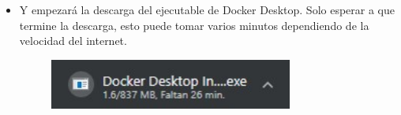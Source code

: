 \begin{itemize}
\begin{figure}[htb]
\begin{center}
					\end{center}
				\end{figure}
				\vspace{5cm}
			\item Y empezará la descarga del ejecutable de Docker Desktop. Solo esperar a que termine la descarga, esto puede tomar varios minutos dependiendo de la velocidad del internet.
				\begin{figure}[htb]
					\begin{center}
						\includegraphics[width=8cm]{./Imagenes/DescargarEjecutableApp}
					\end{center}
				\end{figure}

\end{itemize}
